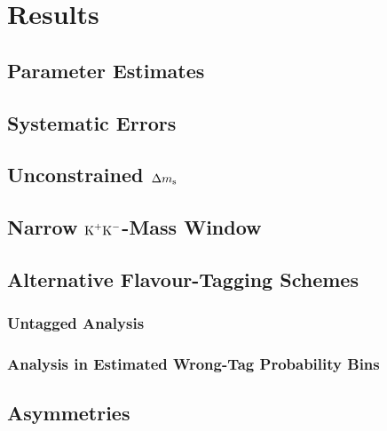 \chapter{Results}

\section{Parameter Estimates}
\section{Systematic Errors}
\section{Unconstrained $\Delta m_\text{s}$}
\section{Narrow $\text{K}^+\text{K}^-$-Mass Window}
\section{Alternative Flavour-Tagging Schemes}
\subsection{Untagged Analysis}
\subsection{Analysis in Estimated Wrong-Tag Probability Bins}
\section{\BsBsbar{} Asymmetries}
